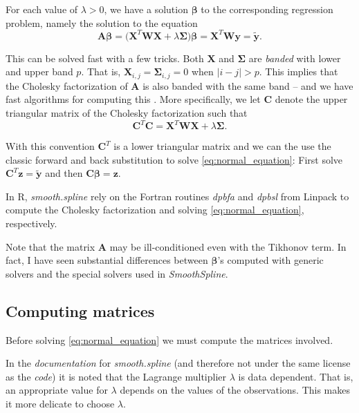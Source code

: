 \documentclass[a4paper]{scrartcl}
\newcommand{\vv}[1]{\ensuremath{\bm{#1}}}
\newcommand{\mat}[1]{\ensuremath{\bm{#1}}}
\newcommand{\T}[1]{\ensuremath{{#1}^{T}}}
\begin{document}
For each value of $\lambda > 0$, we have a solution $\vv\beta$ to the corresponding regression problem, namely the solution to the equation
\begin{equation}
    \label{eq:normal_equation}
    \mat A \vv \beta
    = \bigl(\T{\mat X} \mat W \mat X + \lambda \mat\Sigma\bigr) \vv\beta
    = \T{\mat X} \mat W \vv y 
    = \widetilde{\vv y}.
\end{equation}

This can be solved fast with a few tricks.
Both $\mat X$ and $\mat\Sigma$ are \textit{banded} with lower and upper band $p$.
That is, $\mat X_{i,j} = \mat\Sigma_{i,j} = 0$ when $|i - j| > p$.
This implies that the Cholesky factorization of $\mat A$ is also banded with the same band -- and we have fast algorithms for computing this \cite[Section 4.3]{Golub:van_Loan:2013}.
More specifically, we let $\mat C$ denote the upper triangular matrix of the Cholesky factorization such that 
\begin{equation*}
    \T{\mat C} \mat C = \T{\mat X} \mat W \mat X + \lambda \mat\Sigma.
\end{equation*}

With this convention $\T{\mat C}$ is a lower triangular matrix and we can the use the classic forward and back substitution to solve \cref{eq:normal_equation}:
First solve $\T{\mat C} \vv z = \widetilde{\vv y}$ and then $\mat C \vv \beta = \vv z$.

In R, \textit{smooth.spline} rely on the Fortran routines \textit{dpbfa} and \textit{dpbsl} from Linpack \cite{Dongarra:Moler:Bunch:Stewart:1979} to compute the Cholesky factorization and solving \cref{eq:normal_equation}, respectively.

Note that the matrix $\mat A$ may be ill-conditioned even with the Tikhonov term.
In fact, I have seen substantial differences between $\vv\beta$'s computed with generic solvers and the special solvers used in \textit{SmoothSpline}.


\subsection{Computing matrices}

Before solving \cref{eq:normal_equation} we must compute the matrices involved.

In the \textit{documentation} for \textit{smooth.spline} (and therefore not under the same license as the \textit{code}) it is noted that the Lagrange multiplier $\lambda$ is data dependent.
That is, an appropriate value for $\lambda$ depends on the values of the observations.
This makes it more delicate to choose $\lambda$.
\end{document}
